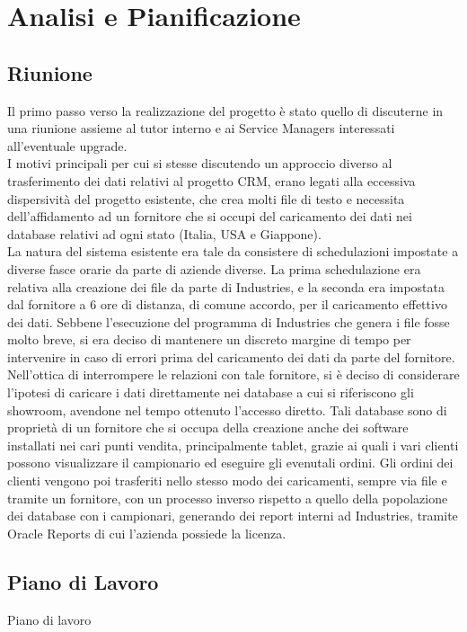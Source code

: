 \section{Analisi e Pianificazione}
\subsection{Riunione}
Il primo passo verso la realizzazione del progetto è stato quello di discuterne in una riunione assieme al tutor interno e ai Service Managers interessati all'eventuale upgrade.\\
I motivi principali per cui si stesse discutendo un approccio diverso al trasferimento dei dati relativi al progetto CRM, erano legati alla eccessiva dispersività del progetto esistente, che crea molti file di testo e necessita dell'affidamento ad un fornitore che si occupi del caricamento dei dati nei database relativi ad ogni stato (Italia, USA e Giappone).\\
La natura del sistema esistente era tale da consistere di schedulazioni impostate a diverse fasce orarie da parte di aziende diverse. La prima schedulazione era relativa alla creazione dei file da parte di Industries, e la seconda era impostata dal fornitore a 6 ore di distanza, di comune accordo, per il caricamento effettivo dei dati. Sebbene l'esecuzione del programma di Industries che genera i file fosse molto breve, si era deciso di mantenere un discreto margine di tempo per intervenire in caso di errori prima del caricamento dei dati da parte del fornitore.\\
Nell'ottica di interrompere le relazioni con tale fornitore, si è deciso di considerare l'ipotesi di caricare i dati direttamente nei database a cui si riferiscono gli showroom, avendone nel tempo ottenuto l'accesso diretto. Tali database sono di proprietà di un fornitore che si occupa della creazione anche dei software installati nei cari punti vendita, principalmente tablet, grazie ai quali i vari clienti possono visualizzare il campionario ed eseguire gli evenutali ordini. Gli ordini dei clienti vengono poi trasferiti nello stesso modo dei caricamenti, sempre via file e tramite un fornitore, con un processo inverso rispetto a quello della popolazione dei database con i campionari, generando dei report interni ad Industries, tramite Oracle Reports di cui l'azienda possiede la licenza.

\subsection{Piano di Lavoro}
 Piano di lavoro


